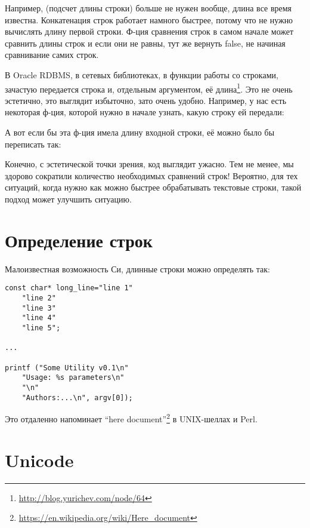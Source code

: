 Например,  (подсчет длины строки) больше не нужен вообще, длина все время известна.
Конкатенация строк работает намного быстрее, потому что не нужно вычислять длину первой строки.
Ф-ция сравнения строк в самом начале может сравнить длины строк и если они не равны, тут же вернуть false,
не начиная сравнивание самих строк.

В Oracle RDBMS, в сетевых библиотеках, в функции работы со строками, зачастую передается строка и, 
отдельным аргументом, её длина\footnote{\url{http://blog.yurichev.com/node/64}}.
Это не очень эстетично, это выглядит избыточно, зато очень удобно.
Например, у нас есть некоторая ф-ция, которой нужно в начале узнать, какую строку ей передали:



А вот если бы эта ф-ция имела длину входной строки, её можно было бы переписать так:



Конечно, с эстетической точки зрения, код выглядит ужасно.
Тем не менее, мы здорово сократили количество необходимых сравнений строк! Вероятно, для тех ситуаций, когда 
нужно как можно быстрее обрабатывать текстовые строки, такой подход может улучшить ситуацию.



\section{Определение строк}

\label{heredoc}
Малоизвестная возможность Си, длинные строки можно определять так:

\begin{lstlisting}
const char* long_line="line 1"
	"line 2"
	"line 3"
	"line 4"
	"line 5";

...

printf ("Some Utility v0.1\n"
	"Usage: %s parameters\n"
	"\n"
	"Authors:...\n", argv[0]);
\end{lstlisting}

Это отдаленно напоминает ``here document''\footnote{\url{https://en.wikipedia.org/wiki/Here_document}} в 
UNIX-шеллах и Perl.



\section{Unicode}

